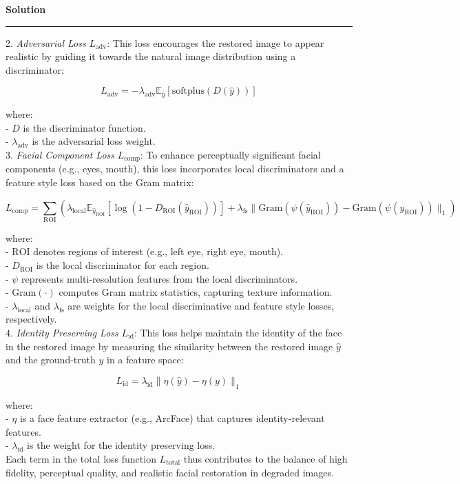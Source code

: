 \documentclass[a4paper,12pt]{article}
\newenvironment{solution}[2][]{%
    \begin{mdframed}[linecolor=blue!70!black, linewidth=2pt, roundcorner=10pt, backgroundcolor=yellow!10!white, skipabove=12pt, skipbelow=12pt]%
        \textbf{\large #2}
        \par\noindent\rule{\textwidth}{0.4pt}
}{
    \end{mdframed}
}
\begin{document}
\begin{solution}{Solution}
2. \textit{Adversarial Loss} \( L_{\text{adv}} \): This loss encourages the restored image to appear realistic by guiding it towards the natural image distribution using a discriminator:

   \[
   L_{\text{adv}} = -\lambda_{\text{adv}} \mathbb{E}_{\hat{y}} \left[ \text{softplus}(D(\hat{y})) \right]
   \]

   where:\\
   - \( D \) is the discriminator function.\\
   - \( \lambda_{\text{adv}} \) is the adversarial loss weight.\\

3. \textit{Facial Component Loss} \( L_{\text{comp}} \): To enhance perceptually significant facial components (e.g., eyes, mouth), this loss incorporates local discriminators and a feature style loss based on the Gram matrix:

   \[
   L_{\text{comp}} = \sum_{\text{ROI}} \left( \lambda_{\text{local}} \mathbb{E}_{\hat{y}_{\text{ROI}}} \left[ \log (1 - D_{\text{ROI}}(\hat{y}_{\text{ROI}})) \right] + \lambda_{\text{fs}} \| \text{Gram}(\psi(\hat{y}_{\text{ROI}})) - \text{Gram}(\psi(y_{\text{ROI}})) \|_1 \right)
   \]

   where: \\
   - \( \text{ROI} \) denotes regions of interest (e.g., left eye, right eye, mouth). \\
   - \( D_{\text{ROI}} \) is the local discriminator for each region.\\
   - \( \psi \) represents multi-resolution features from the local discriminators.\\
   - \( \text{Gram}(\cdot) \) computes Gram matrix statistics, capturing texture information.\\
   - \( \lambda_{\text{local}} \) and \( \lambda_{\text{fs}} \) are weights for the local discriminative and feature style losses, respectively.\\

4. \textit{Identity Preserving Loss} \( L_{\text{id}} \): This loss helps maintain the identity of the face in the restored image by measuring the similarity between the restored image \( \hat{y} \) and the ground-truth \( y \) in a feature space:

   \[
   L_{\text{id}} = \lambda_{\text{id}} \| \eta(\hat{y}) - \eta(y) \|_1
   \]

   where:\\
   - \( \eta \) is a face feature extractor (e.g., ArcFace) that captures identity-relevant features.\\
   - \( \lambda_{\text{id}} \) is the weight for the identity preserving loss.\\

Each term in the total loss function \( L_{\text{total}} \) thus contributes to the balance of high fidelity, perceptual quality, and realistic facial restoration in degraded images.
\end{solution}
\end{document}
